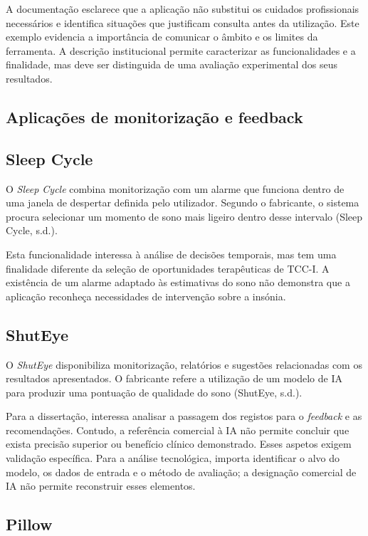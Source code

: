 A documentação esclarece que a aplicação não substitui os cuidados profissionais necessários e identifica situações que justificam consulta antes da utilização. Este exemplo evidencia a importância de comunicar o âmbito e os limites da ferramenta. A descrição institucional permite caracterizar as funcionalidades e a finalidade, mas deve ser distinguida de uma avaliação experimental dos seus resultados.

\subsection{Aplicações de monitorização e feedback}

\subsection*{Sleep Cycle}

O \textit{Sleep Cycle} combina monitorização com um alarme que funciona dentro de uma janela de despertar definida pelo utilizador. Segundo o fabricante, o sistema procura selecionar um momento de sono mais ligeiro dentro desse intervalo (Sleep Cycle, s.d.).

Esta funcionalidade interessa à análise de decisões temporais, mas tem uma finalidade diferente da seleção de oportunidades terapêuticas de TCC-I. A existência de um alarme adaptado às estimativas do sono não demonstra que a aplicação reconheça necessidades de intervenção sobre a insónia.

\subsection*{ShutEye}

O \textit{ShutEye} disponibiliza monitorização, relatórios e sugestões relacionadas com os resultados apresentados. O fabricante refere a utilização de um modelo de IA para produzir uma pontuação de qualidade do sono (ShutEye, s.d.).

Para a dissertação, interessa analisar a passagem dos registos para o \textit{feedback} e as recomendações. Contudo, a referência comercial à IA não permite concluir que exista precisão superior ou benefício clínico demonstrado. Esses aspetos exigem validação específica. Para a análise tecnológica, importa identificar o alvo do modelo, os dados de entrada e o método de avaliação; a designação comercial de IA não permite reconstruir esses elementos.

\subsection*{Pillow}

